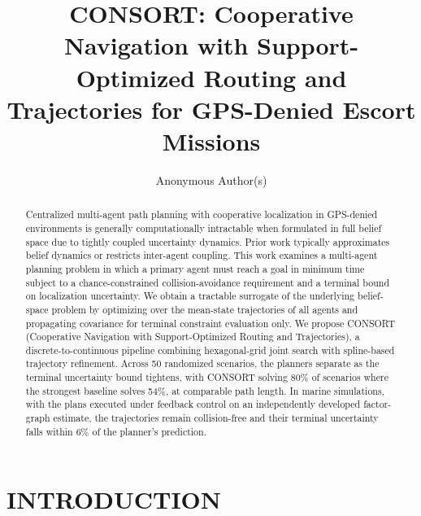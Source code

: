 \documentclass[letterpaper, 10 pt, conference]{ieeeconf}
\title{\LARGE \bf CONSORT: Cooperative Navigation with Support-Optimized Routing and Trajectories for GPS-Denied Escort Missions}
\author{Anonymous Author(s)}
\theoremstyle{remark}
\newcommand{\budget}[1]{\textcolor{RoyalBlue}{\bfseries [BUDGET: #1]}}
\begin{document}
\maketitle
\thispagestyle{empty}
\pagestyle{empty}

\begin{abstract}
Centralized multi-agent path planning with cooperative localization in GPS-denied environments is generally computationally 
intractable when formulated in full belief space due to tightly coupled uncertainty dynamics. Prior work typically approximates belief dynamics
or restricts inter-agent coupling. This work examines a multi-agent planning problem in which a primary agent must reach a goal in minimum time 
subject to a chance-constrained collision-avoidance requirement and a terminal bound on localization uncertainty. We obtain a tractable surrogate
of the underlying belief-space problem by optimizing over the mean-state trajectories of all agents and propagating covariance for terminal constraint evaluation only. 
We propose CONSORT (Cooperative Navigation with Support-Optimized Routing and Trajectories), a discrete-to-continuous pipeline combining hexagonal-grid joint search with spline-based trajectory refinement. 
Across 50 randomized scenarios, the planners separate as the terminal uncertainty bound tightens, with CONSORT solving 80\% of scenarios where the strongest baseline solves 54\%, at comparable path length. 
In marine simulations, with the plans executed under feedback control on an independently developed factor-graph estimate, the  trajectories remain collision-free and their terminal uncertainty falls within 6\% of the planner's prediction.

\end{abstract}
% 
\section{INTRODUCTION}
\end{document}
